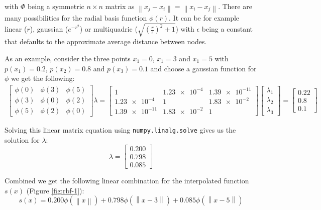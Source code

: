 with $\Phi$ being a symmetric $n \times n $ matrix as $\left\|x_j-x_i\right\|=\left\|x_i-x_j\right\|$. There are many possibilities for the radial basis function $\phi(r)$. It can be for example linear ($r$), gaussian ($e^{-r^2}$) or multiquadric ($\sqrt{\left(\frac{r}{\epsilon}\right)^2 + 1}$) with $\epsilon$ being a constant that defaults to the approximate average distance between nodes.

As an example, consider the three points $x_1=0$, $x_1=3$ and $x_1=5$ with $p(x_1)=0.2$, $p(x_2)=0.8$ and $p(x_3)=0.1$ and choose a gaussian function for $\phi$ we get the following:
\begin{align}
	\begin{bmatrix}
		\phi(0) & \phi(3)  & \phi(5) \\
		\phi(3) & \phi(0) & \phi(2) \\
		\phi(5) & \phi(2)  & \phi(0)
	\end{bmatrix} 
	\lambda
	=
		\begin{bmatrix}
			1              & \num{1.23e-4} & \num{1.39e-11} \\
			\num{1.23e-4}  & 1             & \num{1.83e-2}  \\
			\num{1.39e-11} & \num{1.83e-2} & 1
		\end{bmatrix} 
	\begin{bmatrix}
\lambda_1 \\
\lambda_2 \\
\lambda_3
\end{bmatrix}
=
\begin{bmatrix}
0.22\\0.8\\0.1
\end{bmatrix}
\end{align}

Solving this linear matrix equation using \texttt{numpy.linalg.solve} gives us the solution for $\lambda$:
\begin{equation}
	\lambda=\begin{bmatrix}
	0.200 \\0.798  \\0.085
	\end{bmatrix}
\end{equation}

Combined we get the following linear combination for the interpolated function $s(x)$ (Figure \ref{fig:rbf-1}):
\begin{equation}
	s(x)=0.200\phi(\left\|x\right\|)+
		0.798\phi(\left\|x-3\right\|)+
		0.085\phi(\left\|x-5\right\|)
\end{equation}



